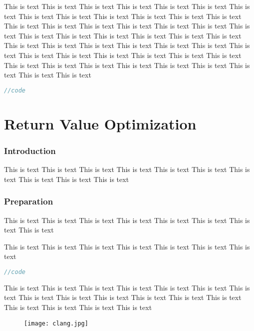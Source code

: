 \documentclass[a4paper]{uestcreport}
\begin{document}
\begin{enumerate}
          This is text This is text This is text This is text This is text This is text This is text This is text This is text This is text This is text This is text This is text This is text This is text This is text This is text This is text This is text This is text This is text This is text This is text This is text This is text This is text This is text This is text This is text This is text This is text This is text This is text This is text This is text This is text This is text This is text This is text This is text This is text This is text This is text This is text This is text This is text This is text This is text 
          \begin{lstlisting}[language=C++]
//code     
    \end{lstlisting}
\end{enumerate}

\newpage

\thispagestyle{fancy}
\fancyhead[L]{}
\fancyhead[R]{}
\setcounter{section}{0}
\part{Return Value Optimization}

\section{Introduction}
This is text This is text This is text This is text This is text This is text This is text This is text This is text This is text 

\section{Preparation}
This is text This is text This is text This is text This is text This is text This is text This is text 

This is text This is text This is text This is text This is text This is text This is text 
\begin{lstlisting}[language=C++]
//code
\end{lstlisting}

This is text This is text This is text This is text This is text This is text This is text This is text This is text This is text This is text This is text This is text This is text This is text This is text This is text 
\begin{figure}[!htbp]
    \centering
    \texttt{[image: clang.jpg]}
\end{figure}
\end{document}
